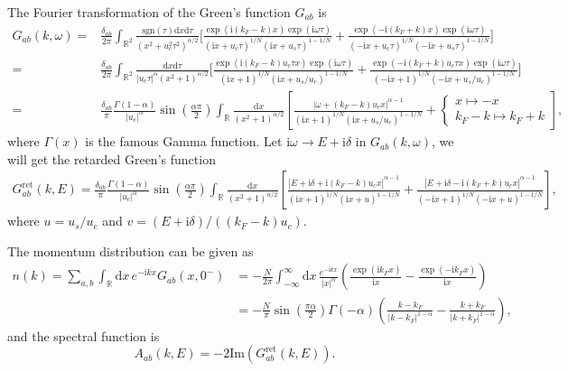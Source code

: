 \documentclass[10pt]{extarticle}
\newcommand{\ii}{\mathrm{i}}
\begin{document}
The Fourier transformation of the Green's function $G_{ab}$ is
\[
\begin{aligned}
	G_{ab}(k,\omega)=&\frac{\delta_{ab}}{2\pi}\int_{\mathbb{R}^2}\frac{\mathrm{sgn}(\tau)\mathrm{d}x\mathrm{d}\tau}{(x^2+u_c^2\tau^2)^{\alpha/2}}\biggl[\frac{\exp(\ii (k_F-k) x)\exp(\ii \omega\tau)}{(\ii x+u_c\tau)^{1/N}(\ii x+u_s\tau)^{1-1/N}}+\frac{\exp(-\ii (k_F+k) x)\exp(\ii \omega\tau)}{(-\ii x+u_c\tau)^{1/N}(-\ii x+u_s\tau)^{1-1/N}}\biggr]\\
	=&\frac{\delta_{ab}}{2\pi}\int_{\mathbb{R}^2}\frac{\mathrm{d}x\mathrm{d}\tau}{|u_c\tau|^{\alpha}(x^2+1)^{\alpha/2}}\biggl[\frac{\exp(\ii (k_F-k)u_c\tau x)\exp(\ii \omega\tau)}{(\ii x+1)^{1/N}(\ii x+u_s/u_c)^{1-1/N}}+\frac{\exp(-\ii (k_F+k)u_c\tau x)\exp(\ii \omega\tau)}{(-\ii x+1)^{1/N}(-\ii x+u_s/u_c)^{1-1/N}}\biggr]\\
	=&\frac{\delta_{ab}}{\pi}\frac{\Gamma(1-\alpha)}{|u_c|^\alpha}\sin\left(\frac{\alpha\pi}{2}\right)\int_{\mathbb{R}}\frac{\mathrm{d}x}{(x^2+1)^{\alpha/2}}\left[\frac{|\omega+(k_F-k)u_cx|^{\alpha-1}}{(\ii x+1)^{1/N}(\ii x+u_s/u_c)^{1-1/N}}+\begin{cases}x\mapsto -x\\ k_F-k\mapsto k_F+k\end{cases}\right],
\end{aligned}
\]
where $\Gamma(x)$ is the famous Gamma function. Let $\ii\omega\to E+\ii\delta$ in $G_{ab}(k,\omega)$, we will get the retarded Green's function
\[
\begin{aligned}
	G^{\text{ret}}_{ab}(k,E)=\frac{\delta_{ab}}{\pi}\frac{\Gamma(1-\alpha)}{|u_c|^\alpha}\sin\left(\frac{\alpha\pi}{2}\right)\int_{\mathbb{R}}\frac{\mathrm{d}x}{(x^2+1)^{\alpha/2}}\left[\frac{|E+\ii \delta+\ii (k_F-k)u_cx|^{\alpha-1}}{(\ii x+1)^{1/N}(\ii x+u)^{1-1/N}}+\frac{|E+\ii\delta-\ii (k_F+k)u_cx|^{\alpha-1}}{(-\ii x+1)^{1/N}(-\ii x+u)^{1-1/N}}\right],
\end{aligned}
\]
where $u=u_s/u_c$ and $v=(E+\ii\delta)/((k_F-k)u_c)$.

The momentum distribution can be given as
\[
\begin{aligned}
	n(k)=\sum_{a,b}\int_\mathbb{R} \mathrm{d}x\, e^{-\ii kx}G_{ab}(x,0^-)&=-\frac{N}{2\pi} \int_{-\infty}^\infty \mathrm{d}x\,\frac{e^{-\ii kx}}{|x|^\alpha}\left(\frac{\exp(\ii k_F x)}{\ii x}-\frac{\exp(-\ii k_F x)}{\ii x}\right)\\
	&=-\frac{N}{\pi}\sin \left(\frac{\pi  \alpha }{2}\right) \Gamma (-\alpha ) \left(\frac{k-k_F}{\left| k-k_F\right| ^{1-\alpha}}-\frac{k+k_F}{\left| k+k_F\right| ^{1-\alpha}}\right),
\end{aligned}
\]
and the spectral function is 
\[
	A_{ab}(k,E)=-2\mathrm{Im} \left(G^{\text{ret}}_{ab}(k,E)\right).
\]
\end{document}
